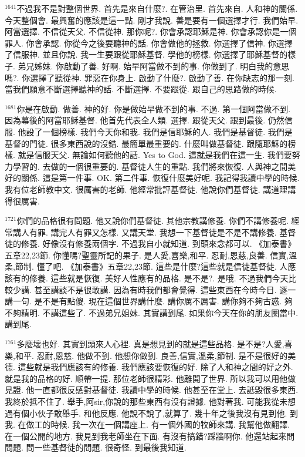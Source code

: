 \documentclass{book}
\begin{document}
$^{1641}$不過我不是對整個世界.
首先是來自什麼?.
在管治里.
首先來自.
人和神的關係.
今天整個會.
最興奮的應該是這一點.
剛才我說.
善是要有一個選擇才行.
我們始早.
阿當選擇.
不信從天父.
不信從神.
那你呢?.
你會承認耶穌是神.
你會承認你是一個罪人.
你會承認.
你從今之後要聽神的話.
你會做他的拯救.
你選擇了信神.
你選擇了信服神.
並且你說.
我一生要跟從耶穌基督.
學他的榜樣.
你選擇了耶穌基督的樣子.
弟兄姊妹.
你啟動了善.
好啊.
始早阿當做不到的事.
你做到了.
明白我的意思嗎?.
你選擇了聽從神.
罪惡在你身上.
啟動了什麼?.
啟動了善.
在你缺志的那一刻.
當我們願意不斷選擇聽神的話.
不斷選擇.
不要跟從.
跟自己的思路做的時候.

$^{1681}$你是在啟動.
做善.
神的好.
你是做始早做不到的事.
不過.
第一個阿當做不到.
因為幕後的阿當耶穌基督.
他首先代表全人類.
選擇.
跟從天父.
跟到最後.
仍然信服.
他設了一個榜樣.
我們今天你和我.
我們是信耶穌的人.
我們是基督徒.
我們是基督的門徒.
很多東西說的沒錯.
最簡單最重要的.
什麼叫做基督徒.
跟隨耶穌的榜樣.
就是信服天父.
無論如何聽他的話.
Yes to God.
這就是我們在這一生.
我們要努力學習的.
去做的一個很重要的.
基督徒人生的重點.
我們將來恢復.
人與神之間美好的關係.
這是第一件事.
OK.
第二件事.
恢復什麼美好呢.
我記得我讀中學的時候.
我有位老師教中文.
很厲害的老師.
他經常批評基督徒.
他說你們基督徒.
講道理講得很厲害.

$^{1721}$你們的品格很有問題.
他又說你們基督徒.
其他宗教講修養.
你們不講修養呢.
經常講人有罪.
講完人有罪又怎樣.
又講天堂.
我想一下基督徒是不是不講修養.
基督徒的修養.
好像沒有修養兩個字.
不過我自小就知道.
到頭來念都可以.
《加泰書》五章22,23節.
你懂嗎?聖靈所記的果子.
是人愛,喜樂,和平.
忍耐,恩慈,良善.
信實,溫柔,節制.
懂了吧.
《加泰書》五章22,23節.
這些是什麼?這些就是信徒基督徒.
人應該有的修養.
這些就是恢復.
美好人性應有的品格.
是不是?.
是哦.
不過我們今天比較少講.
甚至講談不是很敢講.
因為有時我們都會覺得.
這些東西在今時今日.
逐一講一句.
是不是有點傻.
現在這個世界講什麼.
講你厲不厲害.
講你夠不夠古惑.
夠不夠精明.
不講這些了.
不過弟兄姐妹.
其實講到尾.
如果你今天在你的朋友圈當中.
講到尾.

$^{1761}$多麼壞也好.
其實到頭來人心裡.
真是想見到的就是這些品格.
是不是?人愛,喜樂,和平.
忍耐,恩慈.
他做不到.
他想你做到.
良善,信實,溫柔,節制.
是不是很好的美德.
這些就是我們應該有的修養.
我們應該要恢復的好.
除了人和神之間的好之外.
就是我的品格的好.
順帶一提.
那位老師很精彩.
他離開了世界.
所以我可以用他做見證.
他一直都很反感對基督徒.
我讀中學的時候.
他甚至在堂上.
去詆毀很多東西.
我終於抵不住了.
舉手,阿sir,你說的那些東西有沒有證據.
他對著我.
可能我從未想過有個小伙子敢舉手.
和他反應.
他說不說了,就算了.
幾十年之後我沒有見到他.
到我.
在做工的時候.
我一次在一個講座上.
有一個外國的牧師來講.
我幫他做翻譯.
在一個公開的地方.
我見到我老師坐在下面.
有沒有搞錯?踩牆啊你.
他還站起來問問題.
問一些基督徒的問題.
很奇怪.
到最後我知道.
\end{document}
